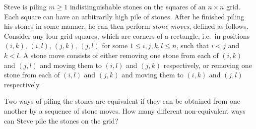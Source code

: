 \begin{example*}
	Steve is piling $m\geq 1$ indistinguishable stones
	on the squares of an $n\times n$ grid.
	Each square can have an arbitrarily high pile of stones.
	After he finished piling his stones in some manner,
	he can then perform \emph{stone moves}, defined as follows.
	Consider any four grid squares, which are corners of a rectangle,
	i.e.\ in positions $(i, k)$, $(i, l)$, $(j, k)$, $(j, l)$
	for some $1\leq i, j, k, l\leq n$, such that $i<j$ and $k<l$.
	A stone move consists of either removing one stone from each of
	$(i, k)$ and $(j, l)$ and moving them to $(i, l)$ and $(j, k)$ respectively,
	or removing one stone from each of $(i, l)$ and $(j, k)$
	and moving them to $(i, k)$ and $(j, l)$ respectively.

	Two ways of piling the stones are equivalent if they can be obtained
	from one another by a sequence of stone moves.
	How many different non-equivalent ways can Steve pile the stones on the grid?
\end{example*} 

